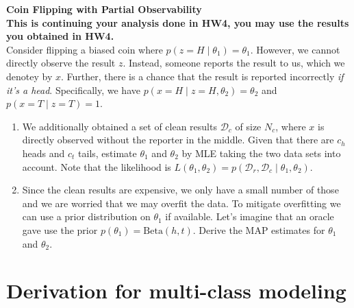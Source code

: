 \documentclass{article}
\newcommand{\nyuparagraph}[1]{\vspace{0.3cm}\textcolor{nyupurple}{\bf \large #1}\\}
\theoremstyle{plain}
\theoremstyle{definition}
\begin{document}
\nyuparagraph{Coin Flipping with Partial Observability}
\textbf{This is continuing your analysis done in HW4, you may use the results you obtained in HW4.}\\
Consider flipping a biased coin where $p(z=H\mid \theta_1) = \theta_1$.
However, we cannot directly observe the result $z$.
Instead, someone reports the result to us,
which we denotey by $x$.
Further, there is a chance that the result is reported incorrectly \emph{if it's a head}.
Specifically, we have $p(x=H\mid z=H, \theta_2) = \theta_2$
and $p(x=T\mid z=T) = 1$.
\begin{enumerate}
  \setcounter{enumi}{\value{saveenum}}
\item We additionally obtained a set of clean results $\mathcal{D}_c$ of size $N_c$, where $x$ is directly observed without the reporter in the middle. Given that there are $c_h$ heads and $c_t$ tails,
estimate $\theta_1$ and $\theta_2$ by MLE taking the two data sets into account.
Note that the likelihood is $L(\theta_1, \theta_2) = p(\mathcal{D}_r, \mathcal{D}_c\mid \theta_1, \theta_2)$.

\item Since the clean results are expensive, we only have a small number of those and we are worried that we may overfit the data.
To mitigate overfitting we can use a prior distribution on $\theta_1$ if available. Let's imagine that an oracle gave use the prior $p(\theta_1) = \text{Beta}(h, t)$.
Derive the MAP estimates for $\theta_1$ and $\theta_2$.
\setcounter{saveenum}{\value{enumi}}
\end{enumerate}
\section{Derivation for multi-class modeling}
\end{document}
